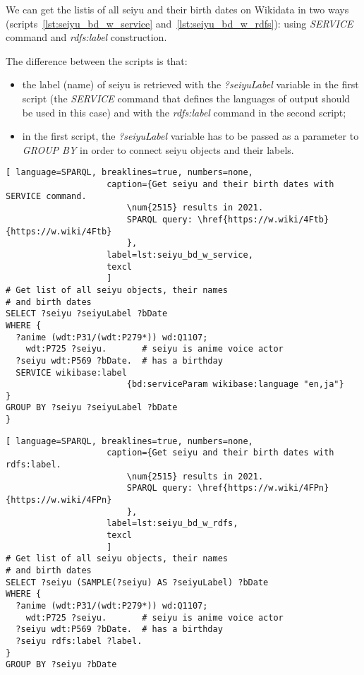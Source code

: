 We can get the listis of all seiyu and their birth dates on Wikidata in two ways (scripts~\ref{lst:seiyu_bd_w_service} and~\ref{lst:seiyu_bd_w_rdfs}): using \emph{SERVICE} command and \emph{rdfs:label} construction.

The difference between the scripts is that:

\begin{itemize}
    \item{the label (name) of seiyu is retrieved with the \emph{?seiyuLabel} variable in the first script (the \emph{SERVICE} command that defines the languages of output should be used in this case) and with the \emph{rdfs:label} command in the second script;}
    \item{in the first script, the \emph{?seiyuLabel} variable has to be passed as a parameter to \emph{GROUP BY} in order to connect seiyu objects and their labels.}
\end{itemize}

\begin{lstlisting}[ language=SPARQL, breaklines=true, numbers=none,
                    caption={Get seiyu and their birth dates with SERVICE command.
                        \num{2515} results in 2021.
                        SPARQL query: \href{https://w.wiki/4Ftb}{https://w.wiki/4Ftb}
                        },
                    label=lst:seiyu_bd_w_service,
                    texcl 
                    ]
# Get list of all seiyu objects, their names
# and birth dates
SELECT ?seiyu ?seiyuLabel ?bDate
WHERE {
  ?anime (wdt:P31/(wdt:P279*)) wd:Q1107;
    wdt:P725 ?seiyu.       # seiyu is anime voice actor
  ?seiyu wdt:P569 ?bDate.  # has a birthday
  SERVICE wikibase:label
						{bd:serviceParam wikibase:language "en,ja"}
}
GROUP BY ?seiyu ?seiyuLabel ?bDate
}
\end{lstlisting}%

\begin{lstlisting}[ language=SPARQL, breaklines=true, numbers=none,
                    caption={Get seiyu and their birth dates with rdfs:label.
                        \num{2515} results in 2021.
                        SPARQL query: \href{https://w.wiki/4FPn}{https://w.wiki/4FPn}
                        },
                    label=lst:seiyu_bd_w_rdfs,
                    texcl 
                    ]
# Get list of all seiyu objects, their names
# and birth dates
SELECT ?seiyu (SAMPLE(?seiyu) AS ?seiyuLabel) ?bDate
WHERE {
  ?anime (wdt:P31/(wdt:P279*)) wd:Q1107;
    wdt:P725 ?seiyu.       # seiyu is anime voice actor
  ?seiyu wdt:P569 ?bDate.  # has a birthday 
  ?seiyu rdfs:label ?label.
}
GROUP BY ?seiyu ?bDate
\end{lstlisting}%

